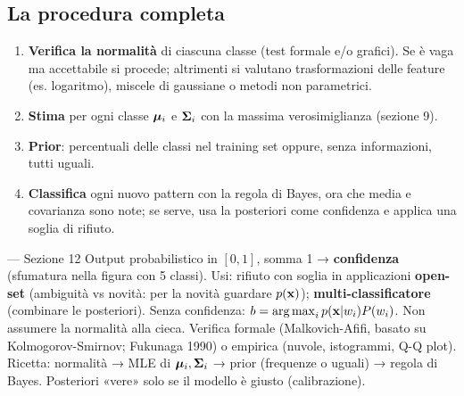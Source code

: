 \subsection{La procedura completa}
\begin{tcolorbox}[enhanced,colback=white,colframe=teal,boxrule=1pt,arc=4pt,left=10pt,right=10pt,title={\headfont\bfseries\small Ricetta: classificatore di Bayes parametrico},colbacktitle=teal,coltitle=white]
\begin{enumerate}
  \item \textbf{Verifica la normalità} di ciascuna classe (test formale e/o grafici). Se è vaga ma accettabile si procede; altrimenti si valutano trasformazioni delle feature (es. logaritmo), miscele di gaussiane o metodi non parametrici.
  \item \textbf{Stima} per ogni classe $\bm{\mu}_i$ e $\bm{\Sigma}_i$ con la massima verosimiglianza (sezione 9).
  \item \textbf{Prior}: percentuali delle classi nel training set oppure, senza informazioni, tutti uguali.
  \item \textbf{Classifica} ogni nuovo pattern con la regola di Bayes, ora che media e covarianza sono note; se serve, usa la posteriori come confidenza e applica una soglia di rifiuto.
\end{enumerate}
\end{tcolorbox}

\begin{appunti}{— Sezione 12}
 Output probabilistico in $[0,1]$, somma 1 → \textbf{confidenza} (sfumatura nella figura con 5 classi).
 Usi: rifiuto con soglia in applicazioni \textbf{open-set} (ambiguità vs novità: per la novità guardare $p(\mathbf{x})$); \textbf{multi-classificatore} (combinare le posteriori). Senza confidenza: $b=\operatorname*{arg\,max}_i p(\mathbf{x}|w_i)P(w_i)$.
 Non assumere la normalità alla cieca. Verifica formale (Malkovich-Afifi, basato su Kolmogorov-Smirnov; Fukunaga 1990) o empirica (nuvole, istogrammi, Q-Q plot).
 Ricetta: normalità → MLE di $\bm{\mu}_i,\bm{\Sigma}_i$ → prior (frequenze o uguali) → regola di Bayes. Posteriori «vere» solo se il modello è giusto (calibrazione).
\end{appunti}
